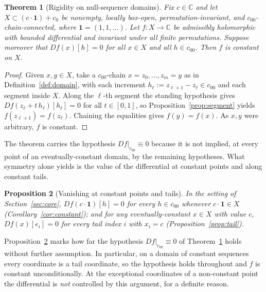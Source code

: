 \documentclass[11pt]{amsart}
\newcommand{\CC}{\mathbb{C}}
\newcommand{\cc}{c_{00}}
\newcommand{\czero}{c_{0}}
\theoremstyle{plain}
\newtheorem{theorem}{Theorem}[section]
\newtheorem{proposition}[theorem]{Proposition}
\theoremstyle{definition}
\theoremstyle{remark}
\begin{document}
\begin{theorem}[Rigidity on null-sequence domains]
\label{thm:rigidity}
Fix $c\in\CC$ and let $X\subset (c\cdot\mathbf 1)+\czero$ be nonempty,
locally box-open, permutation-invariant, and $\cc$-chain-connected, where
$\mathbf 1=(1,1,\ldots)$. Let $f:X\to\CC$ be admissibly holomorphic with
bounded differential and invariant under all finite permutations. Suppose
moreover that $Df(x)[h]=0$ for all $x\in X$ and all $h\in\cc$. Then $f$ is
constant on $X$.
\end{theorem}

\begin{proof}
Given $x,y\in X$, take a $\cc$-chain $x=z_0,\ldots,z_m=y$ as in
Definition~\ref{def:domain}, with each increment
$h_\ell:=z_{\ell+1}-z_\ell\in\cc$ and each segment inside $X$. Along the
$\ell$-th segment the standing hypothesis gives
$Df(z_\ell+t\,h_\ell)[h_\ell]=0$ for all $t\in[0,1]$, so
Proposition~\ref{prop:segment} yields $f(z_{\ell+1})=f(z_\ell)$. Chaining
the equalities gives $f(y)=f(x)$. As $x,y$ were arbitrary, $f$ is constant.
\end{proof}

The theorem carries the hypothesis $Df|_{\cc}\equiv0$ because it is not
implied, at every point of an eventually-constant domain, by the remaining
hypotheses. What symmetry alone yields is the value of the differential at
constant points and along constant tails.

\begin{proposition}[Vanishing at constant points and tails]
\label{prop:uncond}
In the setting of Section~\ref{sec:core}, $Df(c\cdot\mathbf 1)[h]=0$ for
every $h\in\cc$ whenever $c\cdot\mathbf 1\in X$
\textup{(Corollary~\ref{cor:constant})}; and for any eventually-constant
$x\in X$ with value $c$, $Df(x)[e_i]=0$ for every tail index $i$ with
$x_i=c$ \textup{(Proposition~\ref{prop:tail})}.
\end{proposition}

Proposition~\ref{prop:uncond} marks how far the hypothesis
$Df|_{\cc}\equiv0$ of Theorem~\ref{thm:rigidity} holds without further
assumption. In particular, on a domain of constant sequences every
coordinate is a tail coordinate, so the hypothesis holds throughout and $f$
is constant unconditionally. At the exceptional coordinates of a
non-constant point the differential is \emph{not} controlled by this
argument, for a definite reason.
\end{document}
